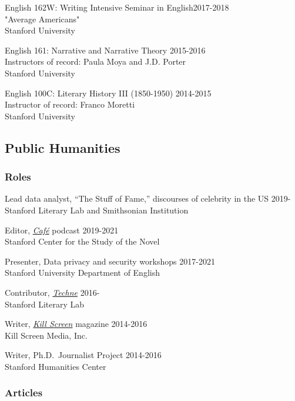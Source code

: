 \documentclass[
  12pt,
  letterpaper,
]{article}
\begin{document}
English 162W: Writing Intensive Seminar in English\hfill 2017-2018\\
"Average Americans"\\
Stanford University

English 161: Narrative and Narrative Theory \hfill 2015-2016\\
Instructors of record: Paula Moya and J.D. Porter\\
Stanford University

English 100C: Literary History III (1850-1950) \hfill 2014-2015\\
Instructor of record: Franco Moretti\\
Stanford University

\hypertarget{public-humanities}{%
\subsection{Public Humanities}\label{public-humanities}}

\hypertarget{roles}{%
\subsubsection{Roles}\label{roles}}

Lead data analyst, ``The Stuff of Fame,'' discourses of celebrity in the
US \hfill 2019-\\
Stanford Literary Lab and Smithsonian Institution

Editor, \href{https://novel.stanford.edu/csn-cafe}{\emph{Café}} podcast
\hfill 2019-2021\\
Stanford Center for the Study of the Novel

Presenter, Data privacy and security workshops \hfill 2017-2021\\
Stanford University Department of English

Contributor, \href{https://litlab.stanford.edu/techne/}{\emph{Techne}}
\hfill 2016-\\
Stanford Literary Lab

Writer, \href{https://web.archive.org/web/20221003115514/https://killscreen.com/previously/author/erik-fredner/}{\emph{Kill Screen}} magazine \hfill 2014-2016\\
Kill Screen Media, Inc.

Writer, Ph.D.~Journalist Project \hfill 2014-2016\\
Stanford Humanities Center

\hypertarget{articles}{%
\subsubsection{Articles}\label{articles}}
\end{document}
